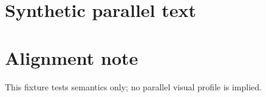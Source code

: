 \documentclass[10pt,twoside,openany]{book}
\begin{document}
\PSEBeginFrontMatter\PSETitlePage\PSEPublicationPage\tableofcontents\clearpage
\PSEBeginBody\chapter{Synthetic parallel text}
\PSEBeginBackMatter\chapter*{Alignment note}
This fixture tests semantics only; no parallel visual profile is implied.\PSEPrintIndex
\end{document}
